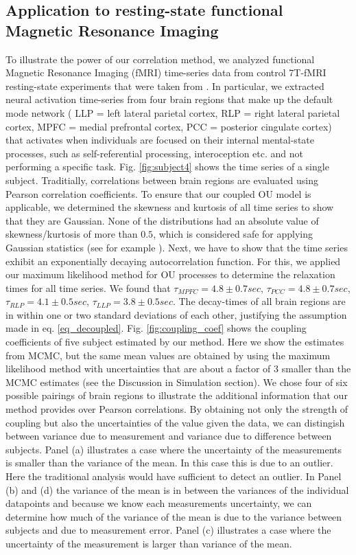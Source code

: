 \documentclass[%
 reprint,
 amsmath,amssymb,
 aps,
]{revtex4-1}
\begin{document}
\subsection{Application to resting-state functional Magnetic Resonance Imaging}
To illustrate the power of our correlation method, we analyzed functional Magnetic Resonance Imaging (fMRI) time-series data from control 7T-fMRI resting-state experiments that were taken from \cite{RN98}.  In particular, we extracted neural activation time-series from four brain regions that make up the default mode network \cite{RN99} ( LLP = left lateral parietal cortex, RLP = right lateral parietal cortex, MPFC = medial prefrontal cortex, PCC = posterior cingulate cortex) that activates when individuals are focused on their internal mental-state processes, such as self-referential processing, interoception etc. and not performing a specific task.  Fig. \ref{fig:subject4} shows the time series of a single subject.  Traditially, correlations between brain regions are evaluated using Pearson correlation coefficients.  To ensure that our coupled OU model is applicable, we determined the skewness and kurtosis of all time series to show that they are Gaussian.  None of the distributions had an absolute value of skewness/kurtosis of more than $0.5$, which is considered safe for applying Gaussian statistics (see for example \cite{RN100}).  Next, we have to show that the time series exhibit an exponentially decaying autocorrelation function.  For this, we applied our maximum likelihood method for OU processes to determine the relaxation times for all time series.  We found that $\tau_{MPFC}=4.8 \pm 0.7 sec$, $\tau_{PCC}=4.8 \pm 0.7 sec$, $\tau_{RLP}=4.1 \pm 0.5 sec$, $\tau_{LLP}=3.8 \pm 0.5 sec$.  The decay-times of all brain regions are in within one or two standard deviations of each other, justifying the assumption made in eq. \ref{eq_decoupled}.
Fig. \ref{fig:coupling_coef} shows the coupling coefficients of five subject estimated by our method.  Here we show the estimates from MCMC, but the same mean values are obtained by using the maximum likelihood method with uncertainties that are about a factor of 3 smaller than the MCMC estimates (see the Discussion in Simulation section).  We chose four of six possible pairings of brain regions to illustrate the additional information that our method provides over Pearson correlations.  By obtaining not only the strength of coupling but also the uncertainties of the value given the data, we can distingish between variance due to measurement and variance due to difference between subjects.  Panel (a) illustrates a case where the uncertainty of the measurements is smaller than the variance of the mean.  In this case this is due to an outlier.  Here the traditional analysis would have sufficient to detect an outlier.  In Panel (b) and (d) the variance of the mean is in between the variances of the individual datapoints and because we know each measurements uncertainty, we can determine how much of the variance of the mean is due to the variance between subjects and due to measurement error.  Panel (c) illustrates a case where the uncertainty of the measurement is larger than variance of the mean.
\end{document}
